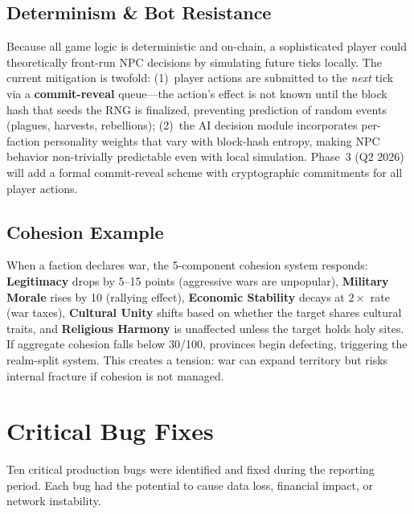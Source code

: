 \documentclass[11pt,a4paper]{article}
\begin{document}
\subsection{Determinism \& Bot Resistance}

Because all game logic is deterministic and on-chain, a sophisticated player could theoretically front-run NPC decisions by simulating future ticks locally. The current mitigation is twofold: (1)~player actions are submitted to the \emph{next} tick via a \textbf{commit-reveal} queue---the action's effect is not known until the block hash that seeds the RNG is finalized, preventing prediction of random events (plagues, harvests, rebellions); (2)~the AI decision module incorporates per-faction personality weights that vary with block-hash entropy, making NPC behavior non-trivially predictable even with local simulation. Phase~3 (Q2 2026) will add a formal commit-reveal scheme with cryptographic commitments for all player actions.

\subsection{Cohesion Example}

When a faction declares war, the 5-component cohesion system responds: \textbf{Legitimacy} drops by 5--15 points (aggressive wars are unpopular), \textbf{Military Morale} rises by 10 (rallying effect), \textbf{Economic Stability} decays at $2\times$ rate (war taxes), \textbf{Cultural Unity} shifts based on whether the target shares cultural traits, and \textbf{Religious Harmony} is unaffected unless the target holds holy sites. If aggregate cohesion falls below 30/100, provinces begin defecting, triggering the realm-split system. This creates a tension: war can expand territory but risks internal fracture if cohesion is not managed.

\section{Critical Bug Fixes}

Ten critical production bugs were identified and fixed during the reporting period. Each bug had the potential to cause data loss, financial impact, or network instability.
\end{document}
